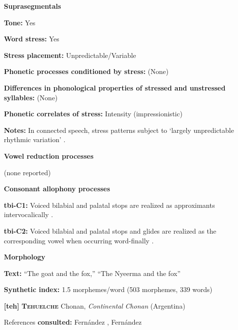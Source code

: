 \textbf{Suprasegmentals}



\textbf{Tone:} Yes



\textbf{Word stress:} Yes



\textbf{Stress placement:} Unpredictable/Variable



\textbf{Phonetic processes conditioned by stress:} (None)



\textbf{Differences in phonological properties of stressed and unstressed syllables:} (None)



\textbf{Phonetic correlates of stress:} Intensity (impressionistic)



\textbf{Notes:} In connected speech, stress patterns subject to ‘largely unpredictable rhythmic variation’ \citep[12-13]{Crewe1975}.



\textbf{Vowel reduction processes}



(none reported)



\textbf{Consonant allophony processes}



\textbf{tbi-C1:} Voiced bilabial and palatal stops are realized as approximants intervocalically \citep[25]{Stirtz2011}.



\textbf{tbi-C2:} Voiced bilabial and palatal stops and glides are realized as the corresponding vowel when occurring word-finally \citep{Stirtz2011}.



\textbf{Morphology}



\textbf{Text:} “The goat and the fox,” “The Nyeerma and the fox” \citep[319-326]{Stirtz2011}



\textbf{Synthetic index:} 1.5 morphemes/word (503 morphemes, 339 words)



\textbf{[teh]}   \textbf{\textsc{Tehuelche}}  Chonan, \textit{Continental} \textit{Chonan} (Argentina)



References \textbf{consulted:} Fernández \citet{Garay1998}, Fernández \citet{GarayHernández2006}



